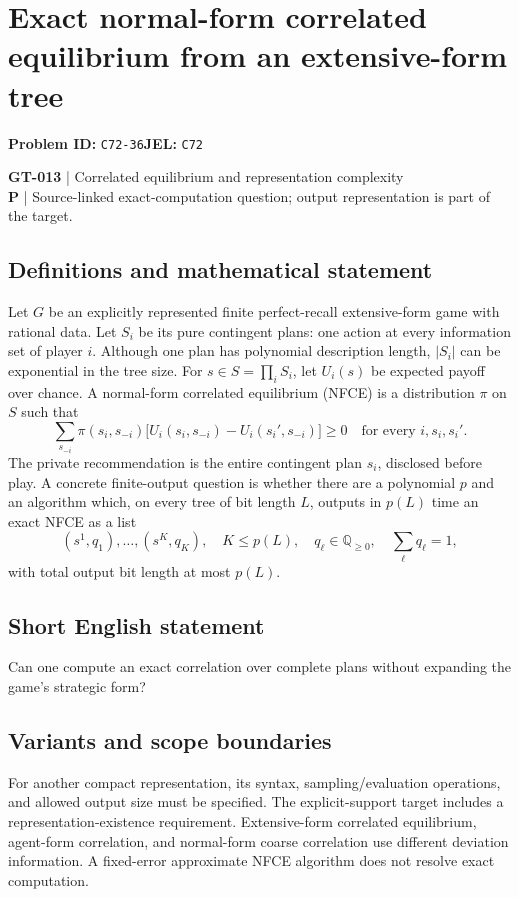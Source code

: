 \documentclass[11pt,a4paper]{article}
\begin{document}
\section*{Exact normal-form correlated equilibrium from an extensive-form tree}
\textbf{Problem ID:} \texttt{C72-36}\quad \textbf{JEL:} \texttt{C72}\par
\label{problem:OP-0143}
\label{game:GT-013}
{\sffamily\small\color{muted}
\textbf{GT-013} | Correlated equilibrium and representation complexity\\
\textbf{P} | Source-linked exact-computation question; output representation is part of the target.
\par}
\subsection*{Definitions and mathematical statement}
Let $G$ be an explicitly represented finite perfect-recall extensive-form game with rational data. Let $S_i$ be its pure contingent plans: one action at every information set of player $i$. Although one plan has polynomial description length, $|S_i|$ can be exponential in the tree size. For $s\in S=\prod_iS_i$, let $U_i(s)$ be expected payoff over chance.
A normal-form correlated equilibrium (NFCE) is a distribution $\pi$ on $S$ such that
\[
 \sum_{s_{-i}}\pi(s_i,s_{-i})
 \bigl[U_i(s_i,s_{-i})-U_i(s_i',s_{-i})\bigr]\geq0
 \quad\text{for every }i,s_i,s_i'.
\]
The private recommendation is the entire contingent plan $s_i$, disclosed before play. A concrete finite-output question is whether there are a polynomial $p$ and an algorithm which, on every tree of bit length $L$, outputs in $p(L)$ time an exact NFCE as a list
\[
 (s^{1},q_1),\ldots,(s^{K},q_K),\quad
 K\leq p(L),\quad q_\ell\in\mathbb Q_{\geq0},\quad\sum_\ell q_\ell=1,
\]
with total output bit length at most $p(L)$.
\subsection*{Short English statement}
Can one compute an exact correlation over complete plans without expanding the game's strategic form?
\subsection*{Variants and scope boundaries}
For another compact representation, its syntax, sampling/evaluation operations, and allowed output size must be specified. The explicit-support target includes a representation-existence requirement. Extensive-form correlated equilibrium, agent-form correlation, and normal-form coarse correlation use different deviation information. A fixed-error approximate NFCE algorithm does not resolve exact computation.
\end{document}
